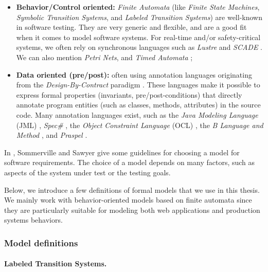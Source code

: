 \begin{itemize}
    \item \textbf{Behavior/Control oriented:} \emph{Finite
        Automata} (like \emph{Finite State Machines},
        \emph{Symbolic Transition Systems}, and \emph{Labeled
        Transition Systems}) are well-known in software testing.
        They are very generic and flexible, and are a good fit
        when it comes to model software systems. For real-time
        and/or safety-critical systems, we often rely on
        synchronous languages such as \emph{Lustre}
        \cite{lustre:ieee} and \emph{SCADE}
        \cite{LeSergent:2011:SCF:2188575.2188578}. We can also
        mention \emph{Petri Nets}, and \emph{Timed Automata}
        \cite{Alur94atheory};

    \item \textbf{Data oriented (pre/post):} often using annotation
        languages originating from the \textit{Design-By-Contract}
        paradigm \cite{Meyer:1992:ADC:618974.619797}. These languages
        make it possible to express formal properties
        (invariants, pre/post-conditions) that directly annotate
        program entities (such as classes, methods, attributes)
        in the source code. Many annotation languages exist, such
        as the \emph{Java Modeling Language} (JML) \cite{jml},
        \emph{Spec\#} \cite{117852}, the \emph{Object Constraint
        Language} (OCL) \cite{Warmer:1998:OCL:291202}, the
        \emph{B Language and Method} \cite{Lano:1996:BLM:525749},
        and \emph{Praspel}
        \cite{Enderlin:2011:PSL:2075545.2075551}.
\end{itemize}

In \cite{Sommerville:1997:REG:549198}, Sommerville and Sawyer
give some guidelines for choosing a model for software
requirements. The choice of a model depends on many factors, such
as aspects of the system under test or the testing goals.

Below, we introduce a few definitions of formal models that we
use in this thesis. We mainly work with behavior-oriented models
based on finite automata since they are particularly suitable for
modeling both web applications and production systems behaviors.

\subsubsection{Model definitions}

\paragraph{Labeled Transition Systems.}
\label{sec:definitions:lts}


